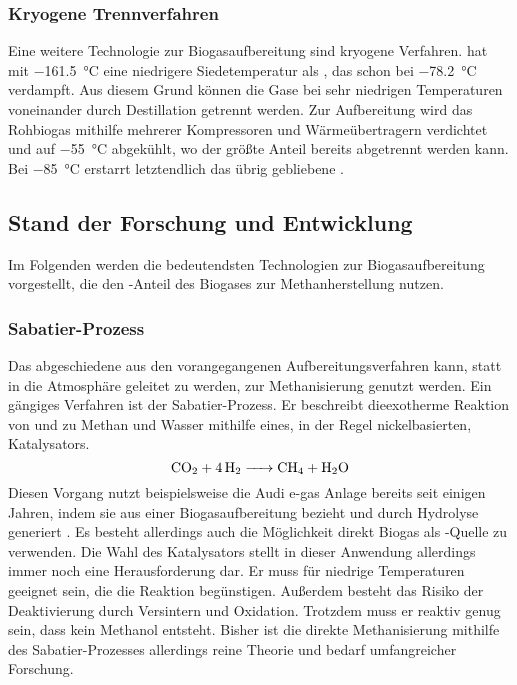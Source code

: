 \subsubsection{Kryogene Trennverfahren}\label{chap:kryo}

Eine weitere Technologie zur Biogasaufbereitung sind kryogene Verfahren.  hat mit \SI{-161,5}{\degreeCelsius} eine niedrigere Siedetemperatur als , das schon bei \SI{-78,2}{\degreeCelsius} verdampft. Aus diesem Grund können die Gase bei sehr niedrigen Temperaturen voneinander durch Destillation getrennt werden. Zur Aufbereitung wird das Rohbiogas mithilfe mehrerer Kompressoren und Wärmeübertragern verdichtet und auf \SI{-55}{\degreeCelsius} abgekühlt, wo der größte Anteil  bereits abgetrennt werden kann. Bei \SI{-85}{\degreeCelsius} erstarrt letztendlich das übrig gebliebene .  \parencite{KGKK2019} \parencite{AONC2019} 


\subsection{Stand der Forschung und Entwicklung}\label{chap:SoR}

Im Folgenden werden die bedeutendsten Technologien zur Biogasaufbereitung vorgestellt, die den -Anteil des Biogases zur Methanherstellung nutzen.


\subsubsection{Sabatier-Prozess}\label{chap:Sabatier}

Das abgeschiedene  aus den vorangegangenen Aufbereitungsverfahren kann, statt in die Atmosphäre geleitet zu werden, zur Methanisierung genutzt werden. Ein gängiges Verfahren ist der Sabatier-Prozess. Er beschreibt dieexotherme Reaktion von  und  zu Methan und Wasser mithilfe eines, in der Regel nickelbasierten, Katalysators. \parencite{AONC2019} 
\begin{equation}
	\ce{CO2 + 4H2 -> CH4 + H2O}
\end{equation}
Diesen Vorgang nutzt beispielsweise die Audi e-gas Anlage bereits seit einigen Jahren, indem sie  aus einer Biogasaufbereitung bezieht und  durch Hydrolyse generiert \parencite{audi13}. \parencite{AONC2019} \newline
Es besteht allerdings auch die Möglichkeit direkt Biogas als -Quelle zu verwenden. Die Wahl des Katalysators stellt in dieser Anwendung allerdings immer noch eine Herausforderung dar. Er muss für niedrige Temperaturen geeignet sein, die die Reaktion begünstigen. Außerdem besteht das Risiko der Deaktivierung durch Versintern und Oxidation. Trotzdem muss er reaktiv genug sein, dass kein Methanol entsteht. Bisher ist die direkte Methanisierung mithilfe des Sabatier-Prozesses allerdings reine Theorie und bedarf umfangreicher Forschung. 
\parencite{AONC2019}


